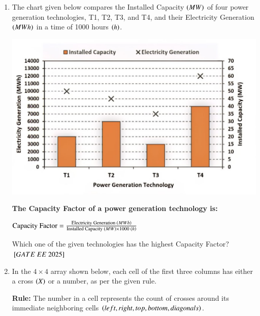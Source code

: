 \documentclass[journal,12pt,onecolumn]{IEEEtran}
\theoremstyle{remark}
\begin{document}
\begin{enumerate}
   \item The chart given below compares the Installed Capacity  $\left(MW\right)$ of four power generation technologies, T1, T2, T3, and T4, and their Electricity Generation  $\left(MWh\right)$ in a time of 1000 hours  $\left(h\right)$.

 

\includegraphics[scale=0.25]{figs/charts.jpg}

 

\textbf{The Capacity Factor of a power generation technology is:}

$
\text{Capacity Factor} = \frac{\text{Electricity Generation  $\left(MWh\right)$}}{\text{Installed Capacity  $\left(MW\right)$} \times 1000 \text{  $\left(h\right)$}}
$

 
 Which one of the given technologies has the highest Capacity Factor? \\    
\hfill ${}\left[GATE\ EE\ 2025\right]$
\begin{enumerate}
    \end{enumerate}

   \item In the $4 \times 4$ array shown below, each cell of the first three columns has either a cross  $\left(X\right)$ or a number, as per the given rule.

\textbf{Rule:} The number in a cell represents the count of crosses around its immediate neighboring cells $\left(left, right, top, bottom, diagonals\right)$.


\end{enumerate}
\end{document}
